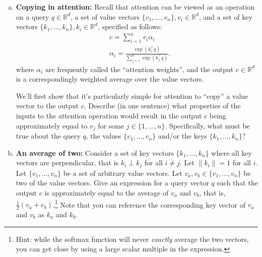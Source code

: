 \begin{enumerate}[(a)]


\item {} \textbf{Copying in attention:} Recall that attention can be viewed as an operation on a query $q\in\mathbb{R}^d$, a set of value vectors $\{v_1,\dots,v_n\}, v_i\in\mathbb{R}^d$, and a set of key vectors $\{k_1,\dots,k_n\}, k_i \in \mathbb{R}^d$, specified as follows:
\begin{align}
&c = \sum_{i=1}^{n} v_i \alpha_i \\
&\alpha_i = \frac{\exp(k_i^\top q)}{\sum_{j=1}^{n} \exp(k_j^\top q)}.
\end{align}
where $\alpha_i$ are frequently called the ``attention weights'', and the output $c\in\mathbb{R}^d$ is a correspondingly weighted average over the value vectors.

We'll first show that it's particularly simple for attention to ``copy'' a value vector to the output $c$.
Describe (in one sentence) what properties of the inputs to the attention operation would result in the output $c$ being approximately equal to $v_j$ for some $j\in\{1,\dots,n\}$. Specifically, what must be true about the query $q$, the values $\{v_1,\dots,v_n\}$ and/or the keys $\{k_1,\dots,k_n\}$?

\begin{answer}
\end{answer}

\item {} \textbf{An average of two:} \label{q_avg_of_two}
Consider a set of key vectors $\{k_1,\dots,k_n\}$ where all key vectors are perpendicular, that is $k_i \perp k_j$ for all $i\not= j$.
Let $\|k_i\|=1$ for all $i$.
Let $\{v_1,\dots,v_n\}$ be a set of arbitrary value vectors.
Let $v_a,v_b\in\{v_1,\dots,v_n\}$ be two of the value vectors.
Give an expression for a query vector $q$ such that the output $c$ is approximately equal to the average of $v_a$ and $v_b$, that is, $\frac{1}{2}(v_a+v_b)$.\footnote{Hint: while the softmax function will never \textit{exactly} average the two vectors, you can get close by using a large scalar multiple in the expression.} Note that you can reference the corresponding key vector of $v_a$ and $v_b$ as $k_a$ and $k_b$.


\end{enumerate}
